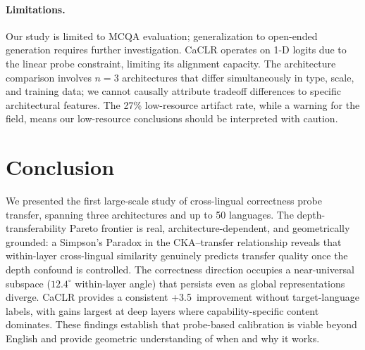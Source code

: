 \documentclass[11pt,a4paper]{article}
\newcommand{\pp}{\,\text{pp}}
\begin{document}
\paragraph{Limitations.}
Our study is limited to MCQA evaluation; generalization to open-ended generation requires further investigation. CaCLR operates on 1-D logits due to the linear probe constraint, limiting its alignment capacity. The architecture comparison involves $n=3$ architectures that differ simultaneously in type, scale, and training data; we cannot causally attribute tradeoff differences to specific architectural features. The 27\% low-resource artifact rate, while a warning for the field, means our low-resource conclusions should be interpreted with caution.

\section{Conclusion}
\label{sec:conclusion}

We presented the first large-scale study of cross-lingual correctness probe transfer, spanning three architectures and up to 50 languages. The depth-transferability Pareto frontier is real, architecture-dependent, and geometrically grounded: a Simpson's Paradox in the CKA--transfer relationship reveals that within-layer cross-lingual similarity genuinely predicts transfer quality once the depth confound is controlled. The correctness direction occupies a near-universal subspace ($12.4^{\circ}$ within-layer angle) that persists even as global representations diverge. CaCLR provides a consistent +3.5\pp{} improvement without target-language labels, with gains largest at deep layers where capability-specific content dominates. These findings establish that probe-based calibration is viable beyond English and provide geometric understanding of when and why it works.
\end{document}
